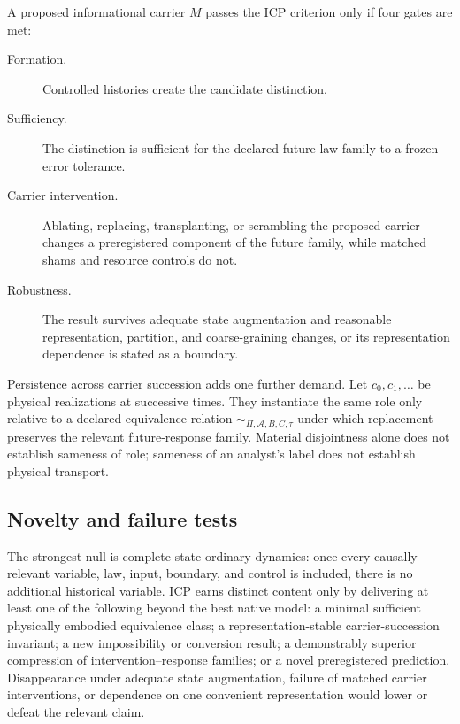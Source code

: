 A proposed informational carrier $M$ passes the ICP criterion only if four
gates are met:
\begin{description}
  \item[Formation.] Controlled histories create the candidate distinction.
  \item[Sufficiency.] The distinction is sufficient for the declared future-law
  family to a frozen error tolerance.
  \item[Carrier intervention.] Ablating, replacing, transplanting, or scrambling
  the proposed carrier changes a preregistered component of the future family,
  while matched shams and resource controls do not.
  \item[Robustness.] The result survives adequate state augmentation and
  reasonable representation, partition, and coarse-graining changes, or its
  representation dependence is stated as a boundary.
\end{description}
Persistence across carrier succession adds one further demand. Let
$c_0,c_1,\ldots$ be physical realizations at successive times. They instantiate
the same role only relative to a declared equivalence relation
$\sim_{\Pi,\mathcal A,B,C,\tau}$ under which replacement preserves the relevant
future-response family. Material disjointness alone does not establish
sameness of role; sameness of an analyst's label does not establish physical
transport.

\subsection{Novelty and failure tests}

The strongest null is complete-state ordinary dynamics: once every causally
relevant variable, law, input, boundary, and control is included, there is no
additional historical variable. ICP earns distinct content only by delivering
at least one of the following beyond the best native model: a minimal
sufficient physically embodied equivalence class; a representation-stable
carrier-succession invariant; a new impossibility or conversion result; a
demonstrably superior compression of intervention--response families; or a
novel preregistered prediction. Disappearance under adequate state
augmentation, failure of matched carrier interventions, or dependence on one
convenient representation would lower or defeat the relevant claim.
